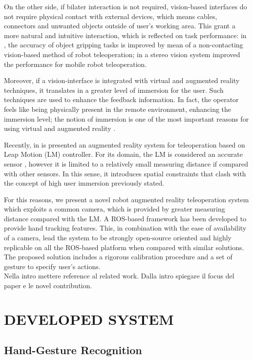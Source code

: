 \documentclass[letterpaper, 10 pt, conference]{ieeeconf}  %
\begin{document}
On the other side, if bilater interaction is not required, vision-based interfaces do not require physical contact with external devices, which means cables, connectors and unwanted objects outside of user's working area. This grant a more natural and intuitive interaction, which is reflected on task performance: in \cite{Kofman2005}, the accuracy of object gripping tasks is improved by mean of a non-contacting vision-based method of robot teleoperation; in \cite{Livatino2009} a stereo vision system improved the performance for mobile robot teleoperation.

Moreover, if a vision-interface is integrated with virtual and augmented reality techniques, it translates in a greater level of immersion for the user. Such techniques are used to enhance the feedback information. In fact, the operator feels like being physically present in the remote environment, enhancing the immersion level; the notion of immersion is one of the most important reasons for using virtual and augmented reality \cite{Boboc2012}.

Recently, in \cite{Peppoloni2015} is presented an augmented reality system for teleoperation based on Leap Motion (LM) controller. For its domain, the LM is considered an accurate sensor \cite{Hedayati2018}, however it is limited to a relatively small measuring distance if compared with other sensors. In this sense, it introduces spatial constraints that clash with the concept of high user immersion previously stated.

For this reasons, we present a novel robot augmented reality teleoperation system which exploits a common camera, which is provided by greater measuring distance compared with the LM. A ROS-based framework has been developed to provide hand tracking features. This, in combination with the ease of availability of a camera, lead the system to be strongly open-source oriented and highly replicable on all the ROS-based platform when compared with similar solutions. The proposed solution includes a rigorous calibration procedure and a set of gesture to specify user's actions.\\

Nella intro mettere reference al related work. Dalla intro spiegare il focus del paper e le novel contribution.

\section{DEVELOPED SYSTEM}

\subsection{Hand-Gesture Recognition}
\end{document}
